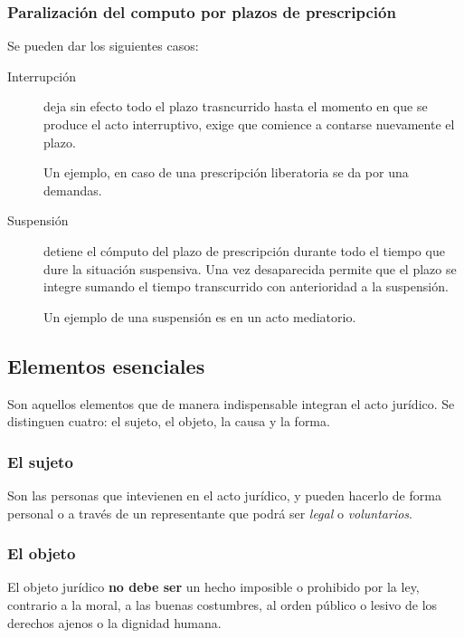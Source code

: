 \documentclass[../resumen.tex]{subfiles}
\begin{document}
\subsubsection{Paralización del computo por plazos de prescripción}

Se pueden dar los siguientes casos:

\begin{description}
  \item[Interrupción] deja sin efecto todo el plazo trasncurrido hasta el momento
    en que se produce el acto interruptivo, exige que comience a contarse nuevamente
    el plazo.

    Un ejemplo, en caso de una prescripción liberatoria se da por una demandas.

  \item[Suspensión] detiene el cómputo del plazo de prescripción durante todo el
    tiempo que dure la situación suspensiva. Una vez desaparecida permite que
    el plazo se integre sumando el tiempo transcurrido con anterioridad a la 
    suspensión.
    
    Un ejemplo de una suspensión es en un acto mediatorio.
\end{description}

\subsection{Elementos esenciales}

Son aquellos elementos que de manera indispensable integran el acto jurídico. Se
distinguen cuatro: el sujeto, el objeto, la causa y la forma.

\subsubsection{El sujeto}

Son las personas que intevienen en el acto jurídico, y pueden hacerlo de forma 
personal o a través de un representante que podrá ser \textit{legal} o \textit{voluntarios}.

\subsubsection{El objeto}

El objeto jurídico \textbf{no debe ser} un hecho imposible o prohibido por la
ley, contrario a la moral, a las buenas costumbres, al orden público o lesivo 
de los derechos ajenos o la dignidad humana.
\end{document}
